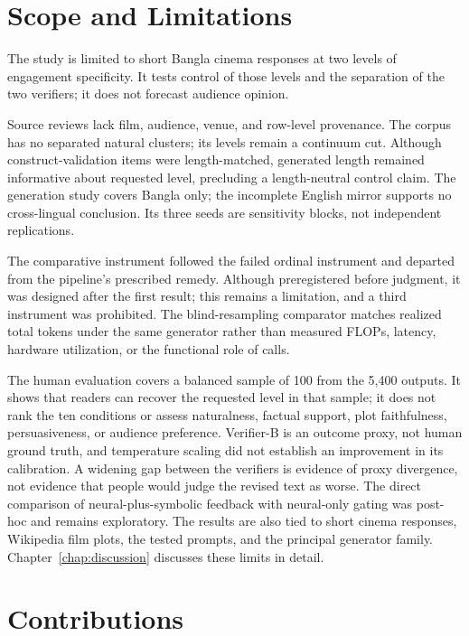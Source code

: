 \section{Scope and Limitations}

The study is limited to short Bangla cinema responses at two levels of engagement specificity. It tests control of those levels and the separation of the two verifiers; it does not forecast audience opinion.

Source reviews lack film, audience, venue, and row-level provenance. The corpus has no separated natural clusters; its levels remain a continuum cut. Although construct-validation items were length-matched, generated length remained informative about requested level, precluding a length-neutral control claim. The generation study covers Bangla only; the incomplete English mirror supports no cross-lingual conclusion. Its three seeds are sensitivity blocks, not independent replications.

The comparative instrument followed the failed ordinal instrument and departed from the pipeline's prescribed remedy. Although preregistered before judgment, it was designed after the first result; this remains a limitation, and a third instrument was prohibited. The blind-resampling comparator matches realized total tokens under the same generator rather than measured FLOPs, latency, hardware utilization, or the functional role of calls.

The human evaluation covers a balanced sample of 100 from the 5,400 outputs. It shows that readers can recover the requested level in that sample; it does not rank the ten conditions or assess naturalness, factual support, plot faithfulness, persuasiveness, or audience preference. Verifier-B is an outcome proxy, not human ground truth, and temperature scaling did not establish an improvement in its calibration. A widening gap between the verifiers is evidence of proxy divergence, not evidence that people would judge the revised text as worse. The direct comparison of neural-plus-symbolic feedback with neural-only gating was post-hoc and remains exploratory. The results are also tied to short cinema responses, Wikipedia film plots, the tested prompts, and the principal generator family. Chapter~\ref{chap:discussion} discusses these limits in detail.

\section{Contributions}

